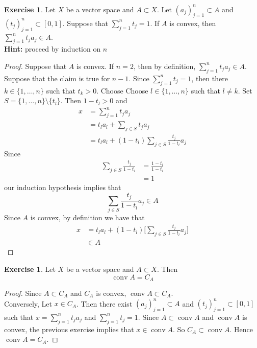\documentclass[12pt]{amsart}
\theoremstyle{definition}
\newtheorem{ex}[definition]{Exercise}
\DeclareMathOperator{\cnv}{conv}
\begin{document}
	\begin{ex}
		Let $X$ be a vector space and $A \subset X$. Let $(a_j)_{j=1}^n \subset A$ and $(t_j)_{j=1}^n \subset [0,1]$. Suppose that $\sum\limits_{j=1}^n t_j = 1$. If $A$ is convex, then $\sum\limits_{j=1}^n t_ja_j \in A$.\\
		\textbf{Hint:} proceed by induction on $n$
	\end{ex}
	

	\begin{proof}
		Suppose that $A$ is convex. If $n = 2$, then by definition, $\sum\limits_{j=1}^n t_ja_j \in A$. \\
		Suppose that the claim is true for $n - 1$. Since $\sum\limits_{j=1}^n t_j = 1$, then there $k \in \{1, \ldots, n\}$ such that $t_k > 0$. Choose Choose $l \in \{1, \ldots, n\}$ such that $l \neq k$. Set $S = \{1, \ldots, n\} \setminus \{t_l\}$. Then $1 - t_l >0$ and  
		\begin{align*}
			x
			&= \sum\limits_{j=1}^n t_j a_j \\
			&= t_l a_l + \sum_{j \in S} t_ja_j \\
			&= t_la_l + (1-t_l) \sum_{j \in S} \frac{t_j}{1 - t_l}a_j
		\end{align*}
		Since 
		\begin{align*}
			\sum_{j \in S} \frac{t_j}{1-t_l} 
			&= \frac{1-t_l}{1-t_l} \\
			&= 1
		\end{align*}
		our induction hypothesis implies that 
		$$\sum\limits_{j \in S} \frac{t_j}{1-t_l} a_j \in A$$ 
		Since $A$ is convex, by definition we have that 
		\begin{align*}
			x 
			&= t_la_l + (1-t_l) \bigg[ \sum_{j \in S} \frac{t_j}{1 - t_l}a_j \bigg] \\
			& \in A
		\end{align*}
	\end{proof}

	\begin{ex}
		Let $X$ be a vector space and $A \subset X$. Then 
		$$\cnv A = C_A$$
	\end{ex}

	\begin{proof}
	Since $A \subset C_A$ and $C_A$ is convex, $\cnv A \subset C_A$. \\
	Conversely, Let $x \in C_A$. Then there exist $(a_j)_{j=1}^n \subset A$ and $(t_j)_{j=1}^n \subset [0,1]$ such that $x = \sum\limits_{j=1}^n t_j a_j$ and $\sum\limits_{j=1}^n t_j = 1$. Since $A \subset \cnv A$ and $\cnv A$ is convex, the previous exercise implies that $x \in \cnv A$. So $C_A \subset \cnv A$. Hence $\cnv A = C_A$.
	\end{proof}
\end{document}
